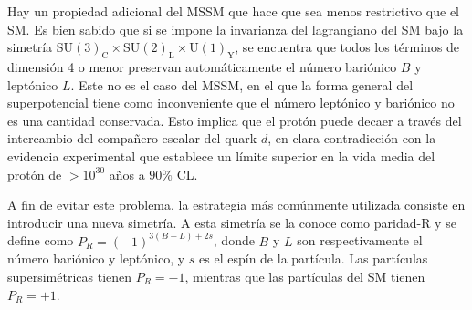 


Hay un propiedad adicional del MSSM que hace que sea menos restrictivo que el SM.
Es bien sabido que si se impone la invarianza del lagrangiano del SM bajo la
simetría $ \text{SU}(3)_\text{C} \times \text{SU}(2)_\text{L} \times \text{U}(1)_\text{Y}$, se
encuentra que todos los términos de dimensión 4 o menor preservan
automáticamente el número bariónico $B$ y leptónico $L$. Este no es el caso del
MSSM, en el que la forma general del superpotencial tiene como inconveniente que
el número leptónico y bariónico no es una cantidad conservada. Esto implica que
el protón puede decaer a través del intercambio del compañero escalar del quark
$d$, en clara contradicción con la evidencia experimental que establece
un límite superior en la vida media del protón de $> 10^{30}$ a\~nos a
$90\%$ CL\cite{PDG}.

A fin de evitar este problema, la estrategia más comúnmente utilizada consiste en introducir
una nueva simetría. A esta simetría se la conoce como paridad-R y se define
como $P_R = (-1)^{3(B-L)+ 2s}$,
donde $B$ y $L$ son respectivamente el número bariónico y leptónico, y $s$ es el
espín de la partícula. Las partículas supersimétricas tienen $P_R = -1$, mientras
que las partículas del SM tienen $P_R = +1$.


